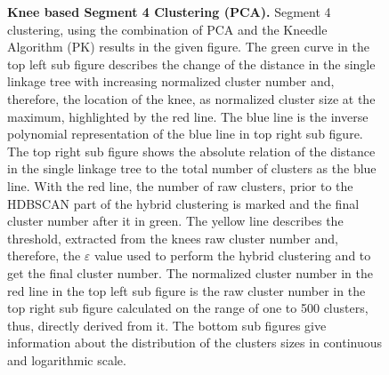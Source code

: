 \begin{figure}[!hbt]
\begin{subfigure}[b]{0.475\textwidth}
    \end{subfigure}
    \caption[Knee based Segment 4 Clustering (\Acrshort{PCA})]{\textbf{Knee based Segment 4 Clustering (\Acrshort{PCA}).} Segment 4 clustering, using the combination of \gls{PCA} and the Kneedle Algorithm (PK) results in the given figure. The green curve in the top left sub figure describes the change of the distance in the single linkage tree with increasing normalized cluster number and, therefore, the location of the knee, as normalized cluster size at the maximum, highlighted by the red line. The blue line is the inverse polynomial representation of the blue line in top right sub figure. The top right sub figure shows the absolute relation of the distance in the single linkage tree to the total number of clusters as the blue line. With the red line, the number of raw clusters, prior to the \gls{HDBSCAN} part of the hybrid clustering is marked and the final cluster number after it in green. The yellow line describes the threshold, extracted from the knees raw cluster number and, therefore, the $\varepsilon$ value used to perform the hybrid clustering and to get the final cluster number. The normalized cluster number in the red line in the top left sub figure is the raw cluster number in the top right sub figure calculated on the range of one to 500 clusters, thus, directly derived from it. The bottom sub figures give information about the distribution of the clusters sizes in continuous and logarithmic scale.}
    \label{fig:PCA_Cluster_Knee_4}
\end{figure}

